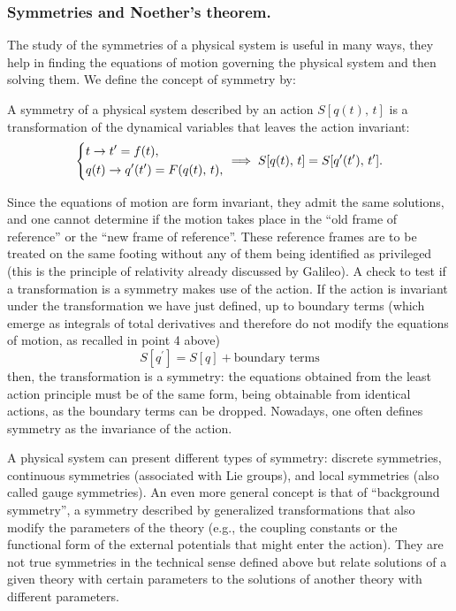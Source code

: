 \subsubsection{Symmetries and Noether’s theorem.}\label{app:Noether}
The study of the symmetries of a physical system is useful in many ways, they help in finding the equations of motion governing the physical system and then solving them. We define the concept of symmetry by:
\begin{definition}[Symmetry]
    A symmetry of a physical system described by an action \(S[q(t),\,t]\) is a transformation of the dynamical variables that leaves the action invariant:
    \[
        \begin{dcases}
            t \to t^{\prime} = f(t),                       \\
            q(t) \to q^{\prime}(t^{\prime}) = F(q(t),\,t), \\
        \end{dcases} \implies S[q(t),\,t] = S[q^{\prime}(t^{\prime}),\,t^{\prime}].
    \]
\end{definition}

Since the equations of motion are form invariant, they admit the same solutions, and one cannot determine if the motion takes place in the “old frame of reference” or the “new frame of reference”. These reference frames are to be treated on the same footing without any of them being identified as privileged (this is the principle of relativity already discussed by Galileo). A check to test if a transformation is a symmetry makes use of the action. If the action is invariant under the transformation we have just defined, up to boundary terms (which emerge as integrals of total derivatives and therefore do not modify the equations of motion, as recalled in point 4 above)
\[
    S[q^{\prime}] = S[q] + \text{boundary terms}
\]
then, the transformation is a symmetry: the equations obtained from the least action principle must be of the same form, being obtainable from identical actions, as the boundary terms can be dropped. Nowadays, one often defines symmetry as the invariance of the action.

A physical system can present different types of symmetry: discrete symmetries, continuous symmetries (associated with Lie groups), and local symmetries (also called gauge symmetries). An even more general concept is that of “background symmetry”, a symmetry described by generalized transformations that also modify the parameters of the theory (e.g., the coupling constants or the functional form of the external potentials that might enter the action). They are not true symmetries in the technical sense defined above but relate solutions of a given theory with certain parameters to the solutions of another theory with different parameters.

